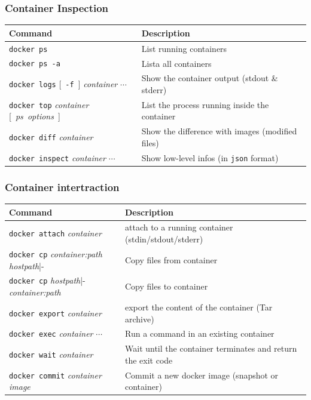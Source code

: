 \documentclass[aspectratio=169]{beamer}
\begin{document}
\begin{frame}
\frametitle{Container Inspection}
	\begin{table}[hbp]
		\center
		\begin{tabular}{lp{21em}}
			\toprule
			\textbf{Command} & \textbf{Description} \\
			\midrule
			\texttt{docker\ ps} & List running containers\\
			\texttt{docker\ ps\ -a} & Lista all containers \\
			\texttt{docker\ logs} [\ \texttt{-f}\ ] \textit{container} $\cdots$ & Show the container output (stdout \& stderr) \\
			\texttt{docker\ top} \textit{container} [\ \textit{ps\ options}\ ] & List the process running inside the container \\
			\texttt{docker diff} \textit{container} & Show the difference with images (modified files) \\
			\texttt{docker inspect} \textit{container} $\cdots$ & Show low-level infos (in \texttt{json} format) \\
			\bottomrule
		\end{tabular}
	\end{table}
\end{frame}

\begin{frame}
\frametitle{Container intertraction}
	\begin{table}[hbp]
		\center
		\begin{tabular}{lp{21em}}
			\toprule
			\textbf{Command} & \textbf{Description} \\
			\midrule
			\texttt{docker\ attach} \textit{container} & attach to a running container (stdin/stdout/stderr) \\
			\texttt{docker\ cp} \textit{container:path hostpath}|- & Copy files from container \\
			\texttt{docker\ cp} \textit{hostpath}|- \textit{container:path} & Copy files to container \\
			\texttt{docker\ export} \textit{container} & export the content of the container (Tar archive) \\
			\texttt{docker exec} \textit{container} $\cdots$ & Run a command in an existing container \\
			\texttt{docker wait} \textit{container} & Wait until the container terminates and return the exit code \\
			\texttt{docker commit} \textit{container image} & Commit a new docker image (snapshot or container) \\
			\bottomrule
		\end{tabular}
	\end{table}
\end{frame}
\end{document}
